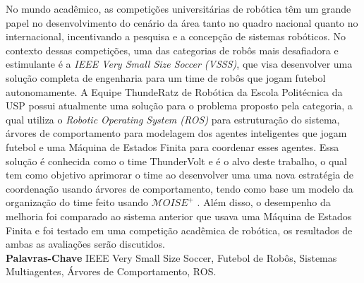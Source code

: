 \def \MOISEp {$\mathcal{M}OISE^+$ }

\begin{resumo}
    No mundo acadêmico, as competições universitárias de robótica têm um grande papel no desenvolvimento do cenário da área tanto no quadro nacional quanto no internacional, incentivando a pesquisa e a concepção de sistemas robóticos. No contexto dessas competições, uma das categorias de robôs mais desafiadora e estimulante é a \textit{IEEE Very Small Size Soccer (VSSS)}, que visa desenvolver uma solução completa de engenharia para um time de robôs que jogam futebol autonomamente. A Equipe ThundeRatz de Robótica da Escola Politécnica da USP possui atualmente uma solução para o problema proposto pela categoria, a qual utiliza o \textit{Robotic Operating System (ROS)} para estruturação do sistema, árvores de comportamento para modelagem dos agentes inteligentes que jogam futebol e uma Máquina de Estados Finita para coordenar esses agentes. Essa solução é conhecida como o time ThunderVolt e é o alvo deste trabalho, o qual tem como objetivo aprimorar o time ao desenvolver uma uma nova estratégia de coordenação usando árvores de comportamento, tendo como base um modelo da organização do time feito usando \MOISEp. Além disso, o desempenho da melhoria foi comparado ao sistema anterior que usava uma Máquina de Estados Finita e foi testado em uma competição acadêmica de robótica, os resultados de ambas as avaliações serão discutidos.
    \\[3\baselineskip]
    \textbf{Palavras-Chave} IEEE Very Small Size Soccer, Futebol de Robôs, Sistemas Multiagentes, Árvores de Comportamento, ROS.
\end{resumo}
